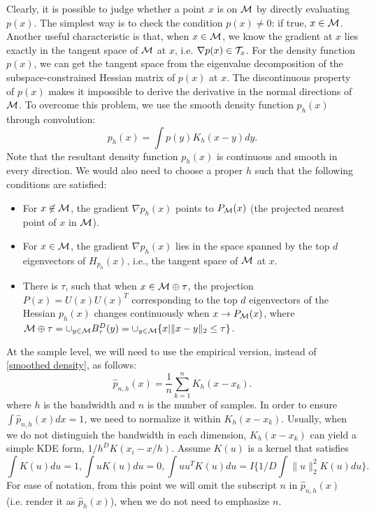 \documentclass[aos,preprint]{imsart}
\theoremstyle{remark}
\begin{document}
Clearly, it is possible to judge whether a point $x$ is on $\cal M$ by directly evaluating $p(x)$. The simplest way is to check the condition $p(x)\not = 0$: if true, $x\in \cal M$. Another useful characteristic is that, when $x\in \cal M$, we know the gradient at $x$ lies exactly in the tangent space of $\cal M$ at $x$, i.e. $\nabla p(x)\in {\cal T}_x$. For the density function $p(x)$, we can get the tangent space from the eigenvalue decomposition of the subspace-constrained Hessian matrix of $p(x)$ at $x$. The discontinuous property of $p(x)$ makes it impossible to derive the derivative in the normal directions of $\cal M$. To overcome this problem, we use the smooth density function $p_h(x)$ through convolution:
\begin{equation}\label{smoothed density}
p_h(x) = \int p(y) K_h(x-y)dy.
\end{equation}
Note that the resultant density function $p_h(x)$ is continuous and smooth in every direction. We would also need to choose a proper $h$ such that the following conditions are satisfied:
\begin{itemize}
\item For $x\not \in \cal M$, the gradient $\nabla p_h(x)$ points to ${P_{\cal M}}(x)$ (the projected nearest point of $x$ in $\cal M$).
\item For $x\in \cal M$, the gradient $\nabla p_h(x)$ lies in the space spanned by the top $d$ eigenvectors of $H_{p_h}(x)$, i.e., the tangent space of $\cal M$ at $x$.
\item There is $\tau$, such that when $x\in \cal M\oplus \tau$, the projection $P(x) = U(x)U(x)^T$ corresponding to the top $d$ eigenvectors of the Hessian $p_h(x)$ changes continuously when $x\rightarrow {P_{\cal M}}(x)$, where ${\cal M}\oplus \tau = \cup_{y\in \cal M} B^D_\tau (y)= \cup_{y\in \cal M} \{x|\|x-y\|_2\leq \tau\}$.
\end{itemize}

At the sample level, we will need to use the empirical version, instead of \eqref{smoothed density}, as follows:
\[
 \hat{p}_{n,h}(x) = \frac{1}{n}\sum_{k=1}^n K_h(x-x_k).
\]
where $h$ is the bandwidth and $n$ is the number of samples. In order to ensure $\int  \hat{p}_{n,h}(x) dx = 1$, we need to normalize it within $K_h(x-x_k)$. Usually, when we do not distinguish the bandwidth in each dimension, $K_h(x-x_k)$ can yield a simple KDE form, ${1}/{h^D} K({x_i-x}/{h})$. Assume $K(u)$ is a kernel that satisfies
\[
\int K(u) du = 1, \int u K(u) du = 0, \int uu^T K(u) du= I \{{1}/{D} \int \|u\|_2^2 K(u) du\} .
\]
For ease of notation, from this point we will omit the subscript $n$ in $ \hat{p}_{n,h}(x)$ (i.e. render it as $\hat{p}_h(x)$), when we do not need to emphasize $n$.
\end{document}
